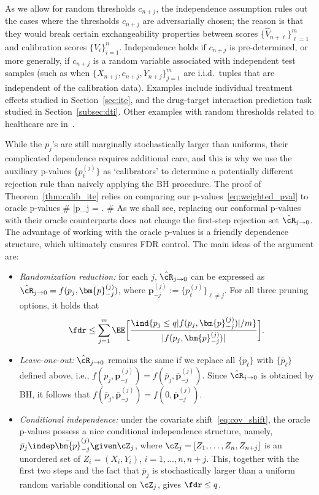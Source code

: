 As we allow for random thresholds $c_{n+j}$, the independence assumption
rules out the cases where the thresholds $c_{n+j}$ are adversarially chosen; the reason is that they would break certain exchangeability properties between scores $\{\hat{V}_{n+\ell}\}_{\ell=1}^m$
and calibration scores $\{V_{i}\}_{i=1}^n$. Independence holds
if $c_{n+j}$ is pre-determined, or more generally, if $c_{n+j}$ is a random variable associated
with independent test samples (such as when
$\{X_{n+j},c_{n+j},Y_{n+j}\}_{j=1}^m$ are i.i.d.~tuples that
are independent of the calibration data).  Examples
include
individual treatment effects studied in Section~\ref{sec:ite},
and the drug-target interaction prediction task studied in Section~\ref{subsec:dti}.
Other examples with random thresholds related to healthcare are in~\cite[Section 2.4]{jin2022selection}.

While the $p_j$'s are still marginally stochastically larger than uniforms, their complicated dependence requires additional care, and this is why
we use the auxiliary p-values $\{p_\ell^{(j)}\}$
as `calibrators' to determine a potentially different rejection rule
than naively applying the BH procedure. The proof of Theorem~\ref{thm:calib_ite}
relies on comparing our p-values~\eqref{eq:weighted_pval}  to
oracle p-values
\#\label{eq:orc_w_pval_nr}
\bar p_j  = .
\#
As we shall see,
replacing our conformal p-values with
their oracle counterparts does not change the first-step
rejection set $\hat\cR_{j\to 0}$. The advantage of working with the oracle p-values is a friendly dependence structure, which ultimately ensures FDR control.
The main ideas of the argument are:

\begin{itemize}
  \item {\em Randomization reduction:} for each $j$,
  $\hat\cR_{j\to 0}$ can be expressed as $\hat\cR_{j\to 0} = f(p_j,\bm{p}_{-j}^{(j)} )$,
  where $\bm{p}_{-j}^{(j)}:=\{p_\ell^{(j)}\}_{\ell\neq j}$. For all three pruning options, it holds that $$\fdr\leq \sum_{j=1}^m \EE\bigg[\frac{ \ind\{  p_j \leq q|f( p_j,\bm{p}_{-j}^{(j)})|/m\}}{ |f( p_j, {\bm{p}}_{-j}^{(j)})| }\bigg].$$
  \item {\em Leave-one-out:} $\hat\cR_{j\to 0}$ remains the same if we replace all $\{p_\ell\}$ with $\{\bar{p}_\ell\}$ defined above, i.e., $f( p_j,\bm{p}_{-j}^{(j)})= f(\bar p_j,\bar{\bm{p}}_{-j}^{(j)})$.
  Since $\hat\cR_{j\to 0}$ is obtained by BH, it follows that $f(\bar p_j,\bar{\bm{p}}_{-j}^{(j)})=f(0,\bar{\bm{p}}_{-j}^{(j)})$.
  \item {\em Conditional independence:}
under the covariate shift~\eqref{eq:cov_shift}, the oracle p-values possess a nice conditional independence structure, namely, $\bar{p}_j \indep \bar{\bm{p}}_{-j}^{(j)} \given \cZ_j$, where $\cZ_j = [Z_1,\dots,Z_n,Z_{n+j}]$ is an unordered set of $Z_i=(X_i,Y_i)$, $i=1,\dots,n,n+j$. This, together with the first two steps and the fact that
  $\bar{p}_j$ is stochastically larger than a uniform random variable conditional on $\cZ_j$, gives $\fdr\leq q$.
\end{itemize}

